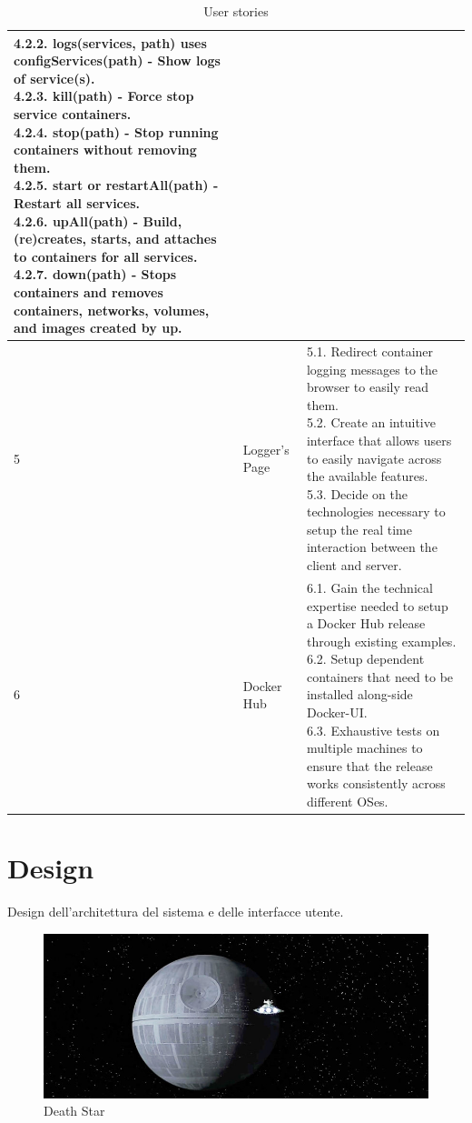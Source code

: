 \documentclass[multi, tikz]{article}
\begin{document}
\begin{table}[!ht]
{\begin{tabular}{|l|l|l|}
{          4.2.2. logs(services, path) uses configServices(path) - Show logs of service(s).\\
          4.2.3. kill(path) - Force stop service containers.\\
          4.2.4. stop(path) - Stop running containers without removing them.\\
          4.2.5. start or restartAll(path) - Restart all services.\\
          4.2.6. upAll(path) - Build, (re)creates, starts, and attaches to containers for all services.\\
          4.2.7. down(path) - Stops containers and removes containers, networks, volumes, and images created by up.
        }
        \\ \hline
        5 & Logger's Page &
        \makecell[l]{
          5.1. Redirect container logging messages to the browser to easily read them.\\
          5.2. Create an intuitive interface that allows users to easily navigate across the available features.\\
          5.3. Decide on the technologies necessary to setup the real time interaction between the client and server.
        }
        \\ \hline
        6 & Docker Hub &
        \makecell[l]{
          6.1. Gain the technical expertise needed to setup a Docker Hub release through existing examples. \\
          6.2. Setup dependent containers that need to be installed along-side Docker-UI.\\
          6.3. Exhaustive tests on multiple machines to ensure that the release works consistently across different OSes.
        }
        \\ \hline
    \end{tabular}
    }%
    \caption{User stories}
\end{table}%



\section{Design}
Design dell'architettura del sistema e delle interfacce utente.

\begin{figure}[h!]
\centering
\includegraphics[scale=0.44]{deathStar2.jpg}
\caption{Death Star}
\label{fig:deathstar}
\end{figure}
\end{document}
